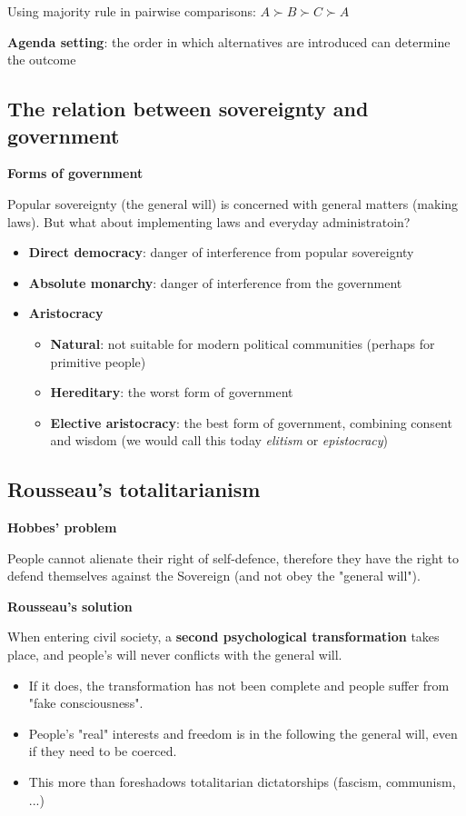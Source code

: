 Using majority rule in pairwise comparisons:
$A \succ B \succ C \succ A$

\textbf{Agenda setting}: the order in which alternatives are introduced can
determine the outcome

\subsection{The relation between sovereignty and government}

\textbf{Forms of government}

Popular sovereignty (the general will) is concerned with general matters
(making laws). But what about implementing laws and everyday
administratoin?


\begin{itemize}
	\item \textbf{Direct democracy}: danger of interference from popular
	sovereignty 
	\item \textbf{Absolute monarchy}: danger of interference from the
	government
	\item \textbf{Aristocracy}
	\begin{itemize}
		\item \textbf{Natural}: not suitable for modern political
		communities (perhaps for primitive people)
		\item \textbf{Hereditary}: the worst form of government
		\item \textbf{Elective aristocracy}: the best form of
		government, combining consent and wisdom (we would call this
		today \textit{elitism} or \textit{epistocracy})
	\end{itemize}
\end{itemize}

\subsection{Rousseau's totalitarianism}

\textbf{Hobbes' problem}

People cannot alienate their right of self-defence, therefore they have the
right to defend themselves against the Sovereign (and not obey the "general
will").

\textbf{Rousseau's solution}

When entering civil society, a \textbf{second psychological transformation}
takes place, and people's will never conflicts with the general will.

\begin{itemize}
	\item If it does, the transformation has not been complete and people
	suffer from "fake consciousness".
	\item People's "real" interests and freedom is in the following the
	general will, even if they need to be coerced.
	\item This more than foreshadows totalitarian dictatorships
	(fascism, communism, ...)
\end{itemize}
